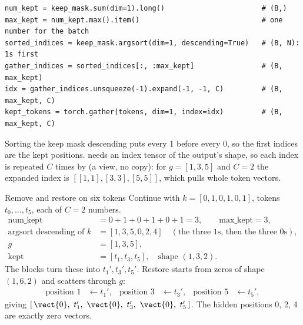 \begin{lstlisting}
num_kept = keep_mask.sum(dim=1).long()                       # (B,)
max_kept = num_kept.max().item()                             # one number for the batch
sorted_indices = keep_mask.argsort(dim=1, descending=True)   # (B, N): 1s first
gather_indices = sorted_indices[:, :max_kept]                # (B, max_kept)
idx = gather_indices.unsqueeze(-1).expand(-1, -1, C)         # (B, max_kept, C)
kept_tokens = torch.gather(tokens, dim=1, index=idx)         # (B, max_kept, C)
\end{lstlisting}
Sorting the keep mask descending puts every 1 before every 0, so the first  indices are
the kept positions.  needs an index tensor of the output's shape, so each index is
repeated $C$ times by  (a view, no copy): for $g = [1, 3, 5]$ and $C = 2$ the expanded index
is $[[1,1], [3,3], [5,5]]$, which pulls whole token vectors.

\begin{worked}[label={we:masking:rr}]{Remove and restore on six tokens}
Continue with $k = [0, 1, 0, 1, 0, 1]$, tokens $t_0, \dots, t_5$, each of $C = 2$ numbers.
\begin{align*}
\text{num\_kept} &= 0 + 1 + 0 + 1 + 0 + 1 = 3, \qquad \text{max\_kept} = 3,\\
\text{argsort descending of } k &= [1, 3, 5, 0, 2, 4] \quad (\text{the three 1s, then the three 0s}),\\
g &= [1, 3, 5],\\
\text{kept} &= [t_1, t_3, t_5], \quad \text{shape } (1, 3, 2) .
\end{align*}
The blocks turn these into $t_1', t_3', t_5'$. Restore starts from zeros of shape $(1, 6, 2)$ and
scatters through $g$:
\begin{align*}
\text{position } 1 &\leftarrow t_1', & \text{position } 3 &\leftarrow t_3', & \text{position } 5 &\leftarrow t_5',
\end{align*}
giving $[\,\vect{0},\ t_1',\ \vect{0},\ t_3',\ \vect{0},\ t_5'\,]$. The hidden positions 0, 2, 4 are
exactly zero vectors.
\end{worked}

